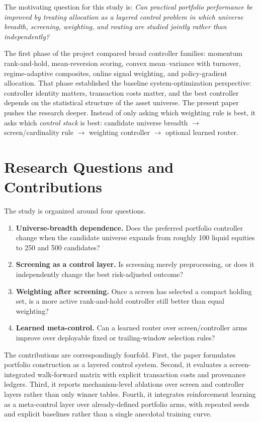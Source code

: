 \documentclass[11pt,a4paper]{article}
\begin{document}
The motivating question for this study is: \emph{Can practical portfolio performance be improved by treating allocation as a layered control problem in which universe breadth, screening, weighting, and routing are studied jointly rather than independently?}

The first phase of the project compared broad controller families: momentum rank-and-hold, mean-reversion scoring, convex mean--variance with turnover, regime-adaptive composites, online signal weighting, and policy-gradient allocation. That phase established the baseline system-optimization perspective: controller identity matters, transaction costs matter, and the best controller depends on the statistical structure of the asset universe. The present paper pushes the research deeper. Instead of only asking which weighting rule is best, it asks which \emph{control stack} is best: candidate universe breadth $\rightarrow$ screen/cardinality rule $\rightarrow$ weighting controller $\rightarrow$ optional learned router.

\section{Research Questions and Contributions}
The study is organized around four questions.
\begin{enumerate}[leftmargin=1.5em]
    \item \textbf{Universe-breadth dependence.} Does the preferred portfolio controller change when the candidate universe expands from roughly 100 liquid equities to 250 and 500 candidates?
    \item \textbf{Screening as a control layer.} Is screening merely preprocessing, or does it independently change the best risk-adjusted outcome?
    \item \textbf{Weighting after screening.} Once a screen has selected a compact holding set, is a more active rank-and-hold controller still better than equal weighting?
    \item \textbf{Learned meta-control.} Can a learned router over screen/controller arms improve over deployable fixed or trailing-window selection rules?
\end{enumerate}
The contributions are correspondingly fourfold. First, the paper formulates portfolio construction as a layered control system. Second, it evaluates a screen-integrated walk-forward matrix with explicit transaction costs and provenance ledgers. Third, it reports mechanism-level ablations over screen and controller layers rather than only winner tables. Fourth, it integrates reinforcement learning as a meta-control layer over already-defined portfolio arms, with repeated seeds and explicit baselines rather than a single anecdotal training curve.
\end{document}
